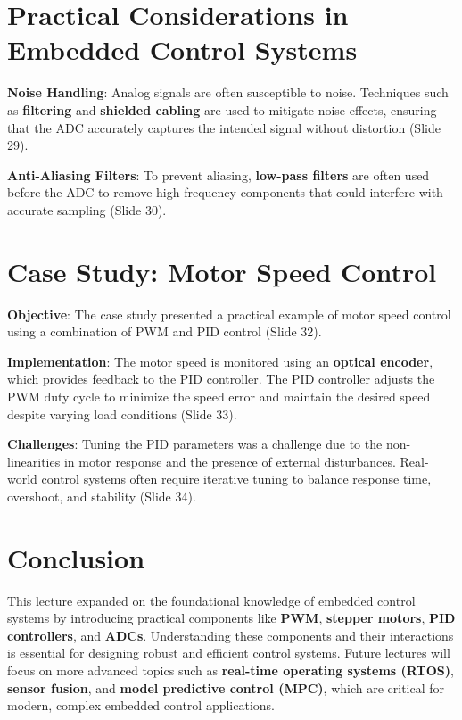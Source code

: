 \documentclass[
  14pt,
  a4paper,
  numbers=noendperiod,
  headinclude=true,
  footinclude=true,
  DIV=calc]{scrreprt}
\begin{document}
\section{Practical Considerations in Embedded Control
Systems}\label{practical-considerations-in-embedded-control-systems}

\textbf{Noise Handling}: Analog signals are often susceptible to noise.
Techniques such as \textbf{filtering} and \textbf{shielded cabling} are
used to mitigate noise effects, ensuring that the ADC accurately
captures the intended signal without distortion (Slide 29).

\textbf{Anti-Aliasing Filters}: To prevent aliasing, \textbf{low-pass
filters} are often used before the ADC to remove high-frequency
components that could interfere with accurate sampling (Slide 30).

\section{Case Study: Motor Speed
Control}\label{case-study-motor-speed-control}

\textbf{Objective}: The case study presented a practical example of
motor speed control using a combination of PWM and PID control (Slide
32).

\textbf{Implementation}: The motor speed is monitored using an
\textbf{optical encoder}, which provides feedback to the PID controller.
The PID controller adjusts the PWM duty cycle to minimize the speed
error and maintain the desired speed despite varying load conditions
(Slide 33).

\textbf{Challenges}: Tuning the PID parameters was a challenge due to
the non-linearities in motor response and the presence of external
disturbances. Real-world control systems often require iterative tuning
to balance response time, overshoot, and stability (Slide 34).

\section{Conclusion}\label{conclusion-6}

This lecture expanded on the foundational knowledge of embedded control
systems by introducing practical components like \textbf{PWM},
\textbf{stepper motors}, \textbf{PID controllers}, and \textbf{ADCs}.
Understanding these components and their interactions is essential for
designing robust and efficient control systems. Future lectures will
focus on more advanced topics such as \textbf{real-time operating
systems (RTOS)}, \textbf{sensor fusion}, and \textbf{model predictive
control (MPC)}, which are critical for modern, complex embedded control
applications.
\end{document}
